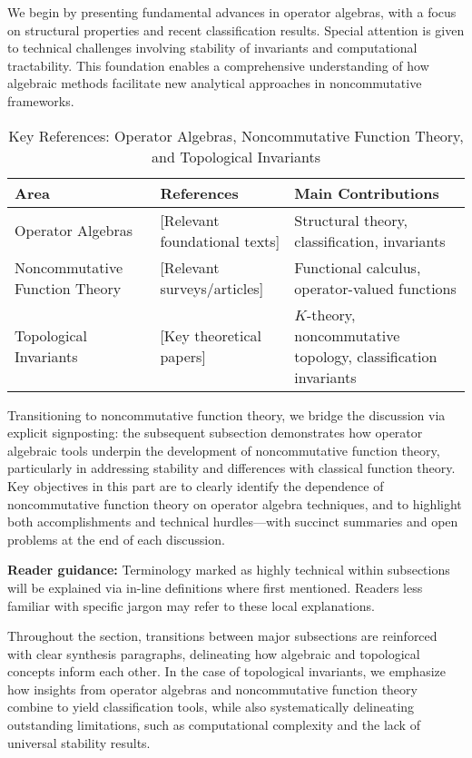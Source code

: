 \documentclass[sigconf]{acmart}
\begin{document}
We begin by presenting fundamental advances in operator algebras, with a focus on structural properties and recent classification results. Special attention is given to technical challenges involving stability of invariants and computational tractability. This foundation enables a comprehensive understanding of how algebraic methods facilitate new analytical approaches in noncommutative frameworks.

\begin{table*}[htbp]
\centering
\caption{Key References: Operator Algebras, Noncommutative Function Theory, and Topological Invariants}
\label{tab:key_references}
\begin{adjustbox}{max width=\textwidth}
\begin{tabular}{@{}lll@{}}
\toprule
Area & References & Main Contributions \\
\midrule
Operator Algebras & [Relevant foundational texts] & Structural theory, classification, invariants \\
Noncommutative Function Theory & [Relevant surveys/articles] & Functional calculus, operator-valued functions \\
Topological Invariants & [Key theoretical papers] & $K$-theory, noncommutative topology, classification invariants \\
\bottomrule
\end{tabular}
\end{adjustbox}
\end{table*}

Transitioning to noncommutative function theory, we bridge the discussion via explicit signposting: the subsequent subsection demonstrates how operator algebraic tools underpin the development of noncommutative function theory, particularly in addressing stability and differences with classical function theory. Key objectives in this part are to clearly identify the dependence of noncommutative function theory on operator algebra techniques, and to highlight both accomplishments and technical hurdles---with succinct summaries and open problems at the end of each discussion.

\textbf{Reader guidance:} Terminology marked as highly technical within subsections will be explained via in-line definitions where first mentioned. Readers less familiar with specific jargon may refer to these local explanations.

Throughout the section, transitions between major subsections are reinforced with clear synthesis paragraphs, delineating how algebraic and topological concepts inform each other. In the case of topological invariants, we emphasize how insights from operator algebras and noncommutative function theory combine to yield classification tools, while also systematically delineating outstanding limitations, such as computational complexity and the lack of universal stability results.
\end{document}
